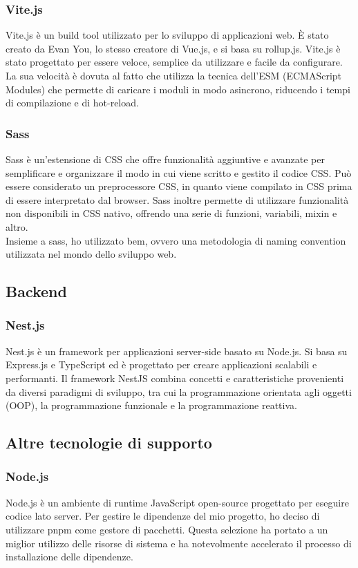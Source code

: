 \subsubsection{Vite.js}\label{subsubsec:vite}
Vite.js è un build tool utilizzato per lo sviluppo di applicazioni web. È stato creato da Evan You, lo stesso creatore di Vue.js, e si basa su rollup.js.
Vite.js è stato progettato per essere veloce, semplice da utilizzare e facile da configurare. La sua velocità è dovuta al fatto che utilizza la tecnica dell'ESM (ECMAScript Modules) 
che permette di caricare i moduli in modo asincrono, riducendo i tempi di compilazione e di hot-reload.
\subsubsection{Sass}\label{subsubsec:sass}
Sass è un'estensione di CSS che offre funzionalità aggiuntive e avanzate per semplificare e organizzare il modo in cui viene scritto e gestito il codice CSS.
Può essere considerato un preprocessore CSS, in quanto viene compilato in CSS prima di essere interpretato dal browser. Sass inoltre permette di utilizzare funzionalità non disponibili in CSS nativo, offrendo una serie di funzioni, variabili, mixin e altro.\\
Insieme a sass, ho utilizzato bem, ovvero una metodologia di naming convention utilizzata nel mondo dello sviluppo web.

\subsection{Backend}\label{subsec:backend}
\subsubsection{Nest.js}\label{subsubsec:nest}
Nest.js è un framework per applicazioni server-side basato su Node.js. Si basa su Express.js e TypeScript ed è progettato per creare applicazioni scalabili e performanti.
Il framework NestJS combina concetti e caratteristiche provenienti da diversi paradigmi di sviluppo, tra cui la programmazione orientata agli oggetti (OOP), la programmazione funzionale e la programmazione reattiva.

\subsection{Altre tecnologie di supporto}\label{subsec:altre-tecnologie-di-supporto}
\subsubsection{Node.js}\label{subsubsec:node.js}
Node.js è un ambiente di runtime JavaScript open-source progettato per eseguire codice lato server. Per gestire le dipendenze del mio progetto,
ho deciso di utilizzare pnpm come gestore di pacchetti. Questa selezione ha portato a un miglior utilizzo delle risorse di sistema e ha notevolmente accelerato il processo di 
installazione delle dipendenze.
